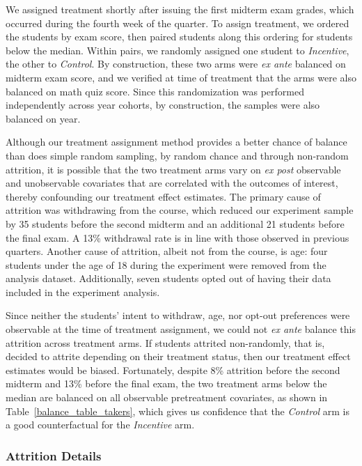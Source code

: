 \documentclass[12pt]{article}
\begin{document}
We assigned treatment shortly after issuing the first midterm exam grades, which occurred during the fourth week of the quarter.
To assign treatment, we ordered the students by exam score, then paired students along this ordering for students below the median.
Within pairs, we randomly assigned one student to \textit{Incentive}, the other to \textit{Control}.
By construction, these two arms were \textit{ex ante} balanced on midterm exam score, and we verified at time of treatment that the arms were also balanced on math quiz score.
Since this randomization was performed independently across year cohorts, by construction, the samples were also balanced on year.

Although our treatment assignment method provides a better chance of balance than does simple random sampling, by random chance and through non-random attrition, it is possible that the two treatment arms vary on \textit{ex post} observable and unobservable covariates that are correlated with the outcomes of interest, thereby confounding our treatment effect estimates.
The primary cause of attrition was withdrawing from the course, which reduced our experiment sample by 35 students before the second midterm and an additional 21 students before the final exam.
A 13\% withdrawal rate is in line with those observed in previous quarters.
Another cause of attrition, albeit not from the course, is age: four students under the age of 18 during the experiment were removed from the analysis dataset.
Additionally, seven students opted out of having their data included in the experiment analysis.

Since neither the students' intent to withdraw, age, nor opt-out preferences were observable at the time of treatment assignment, we could not \textit{ex ante} balance this attrition across treatment arms.
If students attrited non-randomly, that is, decided to attrite depending on their treatment status, then our treatment effect estimates would be biased.
Fortunately, despite 8\% attrition before the second midterm and 13\% before the final exam, the two treatment arms below the median are balanced on all observable pretreatment covariates, as shown in Table~\ref{balance_table_takers}, which gives us confidence that the \textit{Control} arm is a good counterfactual for the \textit{Incentive} arm.

\subsubsection{Attrition Details} \label{subsubsec:a_attrition}
\end{document}
